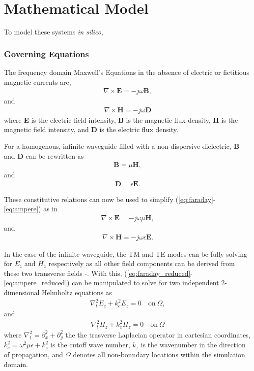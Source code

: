 \section{Mathematical Model}
\label{sec:mathmod}

To model these systems \textit{in silico},

\subsubsection{Governing Equations}
\label{subsub:goveq}

The frequency domain Maxwell's Equations in the absence of electric or fictitious magnetic currents are,
\begin{align}
	\nabla \times \textbf{E} = -j\omega\textbf{B},
	\label{eq:faraday}
\end{align}
and
\begin{align}
	\nabla \times \textbf{H} = -j\omega\textbf{D}
	\label{eq:ampere}
\end{align}
where \textbf{E} is the electric field intensity, \textbf{B} is the magnetic flux density, \textbf{H} is the magnetic field intensity, and \textbf{D} is the electric flux density.

For a homogenous, infinite waveguide filled with a non-dispersive dielectric, \textbf{B} and \textbf{D} can be rewritten as
\begin{align}
	\textbf{B} = \mu \textbf{H},
	\label{eq:corH}
\end{align}
and
\begin{align}
	\textbf{D} = \epsilon \textbf{E}.
	\label{eq:corE}
\end{align}

These constitutive relations can now be used to simplify (\ref{eq:faraday}-\ref{eq:ampere}) as in 
\begin{align}
	\nabla \times \textbf{E} = -j\omega\mu\textbf{H},
	\label{eq:faraday_reduced}
\end{align}
and
\begin{align}
	\nabla \times \textbf{H} = -j\omega\epsilon\textbf{E}.
	\label{eq:ampere_reduced}
\end{align}

In the case of the infinite waveguide, the TM and TE modes can be fully solving for $E_z$ and $H_z$ respectively as all other field components can be derived from these two transverse fields \cite{rothlecnotes}-\cite{jin2011theory}. With this, (\ref{eq:faraday_reduced}-\ref{eq:ampere_reduced}) can be manipulated to solve for two independent 2-dimensional Helmholtz equations as
\begin{align}
	\nabla_t^2 E_z+k_c^2E_z=0 \quad \mathrm{on} \ \Omega,
	\label{eq:tm_helmholtz}
\end{align}
and
\begin{align}
	\nabla_t^2 H_z+k_c^2H_z=0 \quad \mathrm{on} \ \Omega
	\label{eq:te_helmholtz}
\end{align}
where $\nabla_t^2=\partial^2_x+\partial^2_y$ the the trasverse Laplacian operator in cartesian coordinates, $k_c^2=\omega^2\mu\epsilon+k_z^2$ is the cutoff wave number, $k_z$ is the wavenumber in the direction of propagation, and $\Omega$ denotes all non-boundary locations within the simulation domain.

